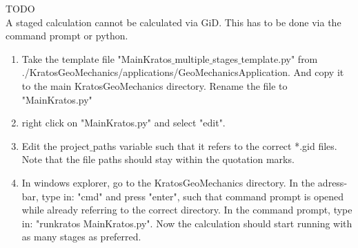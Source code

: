 

TODO \\

A staged calculation cannot be calculated via GiD. This has to be done via the command prompt or python.
\begin{enumerate}[resume]
	\item Take the template file "MainKratos$\_$multiple$\_$stages$\_$template.py" from ./KratosGeoMechanics/applications/GeoMechanicsApplication. And copy it to the main KratosGeoMechanics directory. Rename the file to "MainKratos.py"
	
	\item right click on "MainKratos.py" and select "edit". 
	\item Edit the project$\_$paths variable such that it refers to the correct *.gid files. Note that the file paths should stay within the quotation marks.
	
	\item In windows explorer, go to the KratosGeoMechanics directory. In the adress-bar, type in: "cmd" and press "enter", such that command prompt is opened while already referring to the correct directory. In the command prompt, type in: "runkratos MainKratos.py". Now the calculation should start running with as many stages as preferred. 
	
\end{enumerate}
